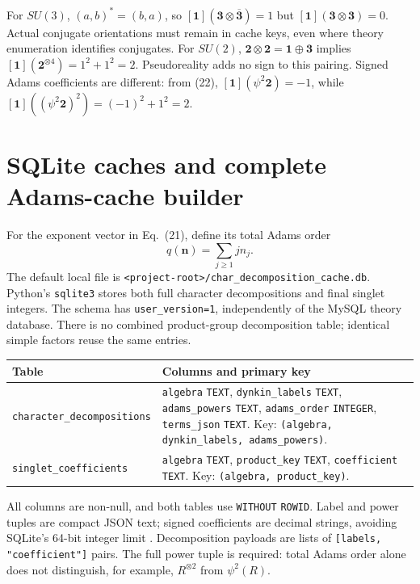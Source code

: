 \documentclass[11pt,a4paper]{article}
\newcommand{\code}[1]{{\small\nolinkurl{#1}}}
\begin{document}
For $SU(3)$, $(a,b)^*=(b,a)$, so
$[\mathbf1](\mathbf3\otimes\overline{\mathbf3})=1$ but
$[\mathbf1](\mathbf3\otimes\mathbf3)=0$. Actual conjugate orientations must remain
in cache keys, even where theory enumeration identifies conjugates.
For $SU(2)$, $\mathbf2\otimes\mathbf2=\mathbf1\oplus\mathbf3$ implies
$[\mathbf1](\mathbf2^{\otimes4})=1^2+1^2=2$. Pseudoreality adds no sign to this
pairing. Signed Adams coefficients are different: from (22),
$[\mathbf1](\psi^2\mathbf2)=-1$, while
$[\mathbf1]((\psi^2\mathbf2)^2)=(-1)^2+1^2=2$.

\clearpage
\section{SQLite caches and complete Adams-cache builder}\label{sec:cache}
For the exponent vector in Eq.~(21), define its total Adams order
\begin{equation}
 q(\mathbf n)=\sum_{j\geq1}j n_j.
\end{equation}
The default local file is \code{<project-root>/char_decomposition_cache.db}.
Python's \code{sqlite3} stores both full character decompositions and final
singlet integers. The schema has \code{user_version=1}, independently of the
MySQL theory database. There is no combined product-group decomposition table;
identical simple factors reuse the same entries.

\begin{tabularx}{\textwidth}{@{}p{50mm}Y@{}}
\toprule Table & Columns and primary key\\\midrule
\code{character_decompositions} & \code{algebra} \code{TEXT}, \code{dynkin_labels} \code{TEXT},
\code{adams_powers} \code{TEXT}, \code{adams_order} \code{INTEGER}, \code{terms_json} \code{TEXT}.
Key: \code{(algebra, dynkin_labels, adams_powers)}.\\[4pt]
\code{singlet_coefficients} & \code{algebra} \code{TEXT}, \code{product_key} \code{TEXT},
\code{coefficient} \code{TEXT}. Key: \code{(algebra, product_key)}.\\\bottomrule
\end{tabularx}
All columns are non-null, and both tables use \code{WITHOUT} \code{ROWID}. Label and
power tuples are compact JSON text; signed coefficients are decimal strings,
avoiding SQLite's 64-bit integer limit \cite{sqlite-types}. Decomposition payloads
are lists of \code{[labels, "coefficient"]} pairs. The full power tuple is required:
total Adams order alone does not distinguish, for example, $R^{\otimes2}$ from
$\psi^2(R)$.
\end{document}
